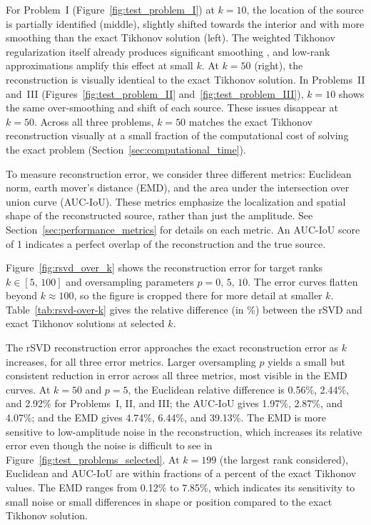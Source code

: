 For Problem~I (Figure~\ref{fig:test_problem_I}) at $k = 10$, the location of the source is partially identified (middle), slightly shifted towards the interior and with more smoothing than the exact Tikhonov solution (left). The weighted Tikhonov regularization itself already produces significant smoothing \cite{elvetunRegularizationOperatorSource2020}, and low-rank approximations amplify this effect at small $k$. At $k = 50$ (right), the reconstruction is visually identical to the exact Tikhonov solution. In Problems~II and~III (Figures~\ref{fig:test_problem_II} and~\ref{fig:test_problem_III}), $k = 10$ shows the same over-smoothing and shift of each source. These issues disappear at $k = 50$. Across all three problems, $k = 50$ matches the exact Tikhonov reconstruction visually at a small fraction of the computational cost of solving the exact problem (Section~\ref{sec:computational_time}).



To measure reconstruction error, we consider three different metrics: Euclidean norm, earth mover's distance (EMD), and the area under the intersection over union curve (AUC-IoU). These metrics emphasize the localization and spatial shape of the reconstructed source, rather than just the amplitude. See Section~\ref{sec:performance_metrics} for details on each metric. An AUC-IoU score of 1 indicates a perfect overlap of the reconstruction and the true source.

Figure~\ref{fig:rsvd_over_k} shows the reconstruction error for target ranks $k \in [5,\, 100]$ and oversampling parameters $p = 0,\, 5,\, 10$. The error curves flatten beyond $k \approx 100$, so the figure is cropped there for more detail at smaller $k$. Table~\ref{tab:rsvd-over-k} gives the relative difference (in \%) between the rSVD and exact Tikhonov solutions at selected $k$.

The rSVD reconstruction error approaches the exact reconstruction error as $k$ increases, for all three error metrics. Larger oversampling $p$ yields a small but consistent reduction in error across all three metrics, most visible in the EMD curves. At $k = 50$ and $p = 5$, the Euclidean relative difference is 0.56\%, 2.44\%, and 2.92\% for Problems~I, II, and III; the AUC-IoU gives 1.97\%, 2.87\%, and 4.07\%; and the EMD gives 4.74\%, 6.44\%, and 39.13\%. The EMD is more sensitive to low-amplitude noise in the reconstruction, which increases its relative error even though the noise is difficult to see in Figure~\ref{fig:test_problems_selected}. At $k = 199$ (the largest rank considered), Euclidean and AUC-IoU are within fractions of a percent of the exact Tikhonov values. The EMD ranges from 0.12\% to 7.85\%, which indicates its sensitivity to small noise or small differences in shape or position compared to the exact Tikhonov solution.


